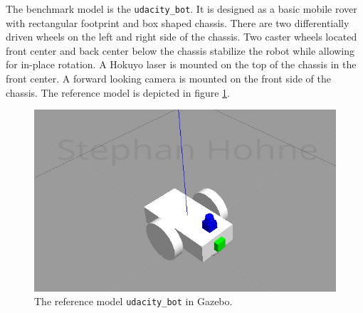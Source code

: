 \documentclass[10pt,journal,compsoc]{IEEEtran}
\begin{document}
The benchmark model is the \texttt{udacity\_bot}. It is designed as a basic mobile rover with rectangular footprint and box shaped chassis. There are two differentially driven wheels on the left and right side of the chassis. Two caster wheels located front center and back center below the chassis stabilize the robot while allowing for in-place rotation. A Hokuyo laser is mounted on the top of the chassis in the front center. A forward looking camera is mounted on the front side of the chassis. The reference model is depicted in figure \ref{fig:udacity_bot}.
\begin{figure}[htpb]
      \centering
      \includegraphics[width=\linewidth]{images/udacity_bot_gazebo_signed.PNG}
      \caption{The reference model \texttt{udacity\_bot} in Gazebo.}
      \label{fig:udacity_bot}
\end{figure}
\end{document}

